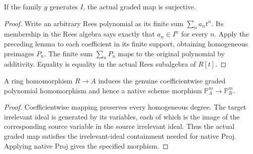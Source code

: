 \endgroup

\begingroup

\begin{theorem}\label{thm:rees-polynomial-surjective}
\leanok
If the family $g$ generates $I$, the actual graded map is surjective.
\end{theorem}
\begin{proof}
Write an arbitrary Rees polynomial as its finite sum
$\sum_n a_nt^n$. Its membership in the Rees algebra says exactly that
$a_n\in I^n$ for every $n$. Apply the preceding lemma to each coefficient
in its finite support, obtaining homogeneous preimages $P_n$.
The finite sum $\sum_nP_n$ maps to the original polynomial by additivity.
Equality is equality in the actual Rees subalgebra of $R[t]$.
\end{proof}

\endgroup

\begingroup

\begin{definition}
\label{def:blowup-projective-coefficient-map}
\leanok
{}
A ring homomorphism $R\to A$ induces the genuine coefficientwise graded
polynomial homomorphism and hence a native scheme morphism
$\mathbb P^m_A\to\mathbb P^m_R$.
\end{definition}
\begin{proof}
Coefficientwise mapping preserves every homogeneous degree. The target
irrelevant ideal is generated by its variables, each of which is the image
of the corresponding source variable in the source irrelevant ideal.
Thus the actual graded map satisfies the irrelevant-ideal containment
needed for native Proj. Applying native Proj gives the specified morphism.
\end{proof}

\endgroup

\begingroup

